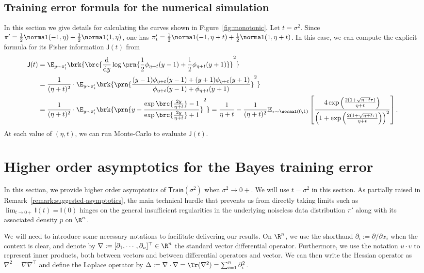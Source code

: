 \documentclass[11pt]{article}
\newcommand{\trerr}{\mathsf{Train}}
\newcommand{\de}{\mathrm{d}}
\newcommand{\jfunc}{\mathsf{J}}
\newcommand{\ifunc}{\mathsf{I}}
\begin{document}
\subsection{Training error formula for the numerical simulation} \label{sec:simulation-calculations}
In this section we give details for calculating the curves shown in Figure~\ref{fig:monotonic}.
Let $t= \sigma^2$. Since $\pi' = \frac{1}{2} \normal(-1, \eta) + \frac{1}{2} \normal(1, \eta)$, one has $\pi'_t = \frac{1}{2} \normal(-1, \eta+t) + \frac{1}{2} \normal(1, \eta+t)$. In this case, we can compute the explicit formula for its Fisher information $\jfunc(t)$ from
\begin{align*}
    \jfunc(t) & = \E_{y \sim \pi'_t} \brk{\brc{\frac{\de}{\de y} \log \prn{\frac{1}{2} \phi_{\eta + t}(y-1) + \frac{1}{2} \phi_{\eta+ t}(y+1) } }^2} \\
    & = \frac{1}{(\eta + t)^2} \cdot \E_{y \sim \pi'_t} \brk{\prn{\frac{(y-1) \phi_{\eta+ t}(y-1)+(y+1) \phi_{\eta+ t}(y+1)}{\phi_{\eta+ t}(y-1)+\phi_{\eta+ t}(y+1)}}^2} \nonumber \\
    & = \frac{1}{(\eta + t)^2} \cdot \E_{y \sim \pi'_t} \brk{\prn{y - \frac{\exp \brc{\frac{2y}{\eta + t}} - 1}{\exp \brc{\frac{2y}{\eta + t}} + 1}}^2} = \frac{1}{\eta+t}-\frac{1}{(\eta+t)^2} \mathbb{E}_{\tau \sim \normal(0,1)}\left[\frac{4 \exp \left(\frac{2(1+\sqrt{\eta+t} \tau)}{\eta+t}\right)}{\left(1+\exp \left(\frac{2(1+\sqrt{\eta+t} \tau)}{\eta+t}\right)\right)^2}\right].
\end{align*}
At each value of $(\eta, t)$, we can run Monte-Carlo to evaluate $\jfunc(t)$.


\section{Higher order asymptotics for the Bayes training error} \label{sec:higher-order}
In this section, we provide higher order asymptotics of $\trerr(\sigma^2)$ when $\sigma^2 \to 0+$. We will use $t=\sigma^2$ in this section. As partially raised in Remark~\ref{remark:suggested-asymptotics}, the main technical hurdle that prevents us from directly taking limits such as $\lim_{t \to 0+} \ifunc(t) = \ifunc(0)$ hinges on the general insufficient regularities in the underlying noiseless data distribution $\pi'$ along with its associated density $p$ on $\R^n$. 

We will need to introduce some necessary notations to facilitate delivering our results. On $\R^n$, we use the shorthand $\partial_i := \partial/\partial x_i$ when the context is clear, and denote by $\nabla := [\partial_1, \cdots, \partial_n]^\top \in \R^n$ the standard vector differential operator. Furthermore, we use the notation $u \cdot v$ to represent inner products, both between vectors and between differential operators and vector. We can then write the Hessian operator as $\nabla^2 = \nabla \nabla^\top$ and define the Laplace operator by $\Delta := \nabla \cdot \nabla = \Tr(\nabla^2) = \sum_{i=1}^n \partial_i^2$.
\end{document}
